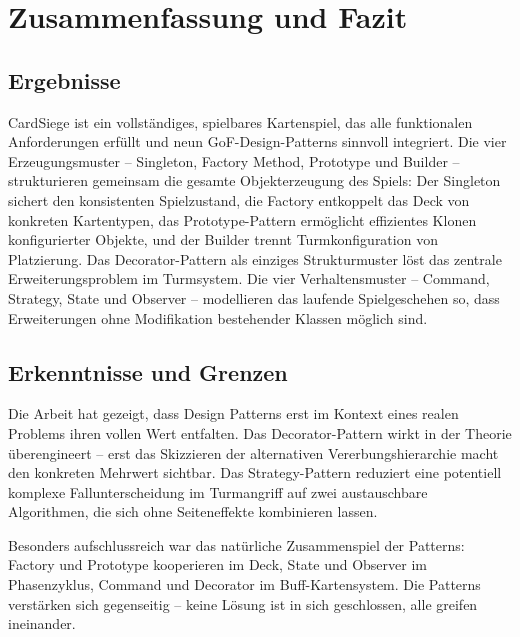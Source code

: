 \section{Zusammenfassung und Fazit}

\subsection{Ergebnisse}

CardSiege ist ein vollständiges, spielbares Kartenspiel, das alle funktionalen
Anforderungen erfüllt und neun GoF-Design-Patterns sinnvoll integriert. Die vier
Erzeugungsmuster -- Singleton, Factory Method, Prototype und Builder -- strukturieren
gemeinsam die gesamte Objekterzeugung des Spiels: Der Singleton sichert den
konsistenten Spielzustand, die Factory entkoppelt das Deck von konkreten
Kartentypen, das Prototype-Pattern ermöglicht effizientes Klonen konfigurierter
Objekte, und der Builder trennt Turmkonfiguration von Platzierung. Das
Decorator-Pattern als einziges Strukturmuster löst das zentrale Erweiterungsproblem
im Turmsystem. Die vier Verhaltensmuster -- Command, Strategy, State und Observer --
modellieren das laufende Spielgeschehen so, dass Erweiterungen ohne Modifikation
bestehender Klassen möglich sind.

\subsection{Erkenntnisse und Grenzen}

Die Arbeit hat gezeigt, dass Design Patterns erst im Kontext eines realen Problems
ihren vollen Wert entfalten. Das Decorator-Pattern wirkt in der Theorie
überengineert -- erst das Skizzieren der alternativen Vererbungshierarchie macht
den konkreten Mehrwert sichtbar. Das Strategy-Pattern reduziert eine potentiell
komplexe Fallunterscheidung im Turmangriff auf zwei austauschbare Algorithmen,
die sich ohne Seiteneffekte kombinieren lassen.

Besonders aufschlussreich war das natürliche Zusammenspiel der Patterns: Factory
und Prototype kooperieren im Deck, State und Observer im Phasenzyklus, Command
und Decorator im Buff-Kartensystem. Die Patterns verstärken sich gegenseitig --
keine Lösung ist in sich geschlossen, alle greifen ineinander.

